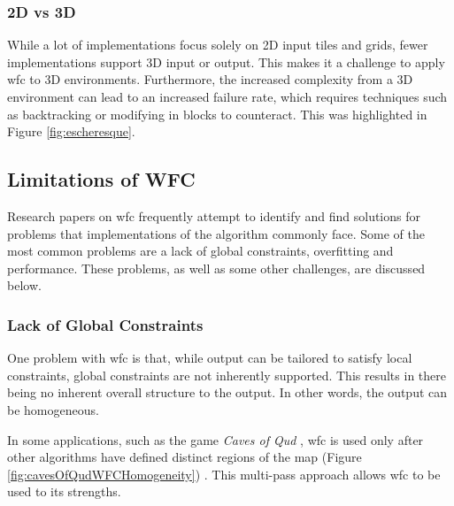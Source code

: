 \subsubsection{2D vs 3D}
While a lot of implementations focus solely on 2D input tiles and grids, fewer implementations support 3D input or output. This makes it a challenge to apply \acrshort{wfc} to 3D environments. Furthermore, the increased complexity from a 3D environment can lead to an increased failure rate, which requires techniques such as backtracking or modifying in blocks to counteract. This was highlighted in Figure \ref{fig:escheresque}.

\subsection{Limitations of WFC}
Research papers on \acrshort{wfc} frequently attempt to identify and find solutions for problems that implementations of the algorithm commonly face. Some of the most common problems are a lack of global constraints, overfitting and performance. These problems, as well as some other challenges, are discussed below.


\subsubsection{Lack of Global Constraints}\label{sec:lackOfGlobalConstraints}
One problem with \acrshort{wfc} is that, while output can be tailored to satisfy local constraints, global constraints are not inherently supported. This results in there being no inherent overall structure to the output. In other words, the output can be homogeneous.

In some applications, such as the game \textit{Caves of Qud} \cite{cavesofqud}, \acrshort{wfc} is used only after other algorithms have defined distinct regions of the map (Figure \ref{fig:cavesOfQudWFCHomogeneity}) \cite{WFC_ConstraintSolving_and_ML, WFC_Design_Constraints, GDC_caves_of_qud}. This multi-pass approach allows \acrshort{wfc} to be used to its strengths.

